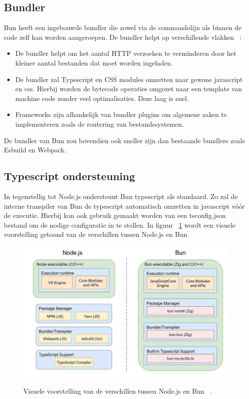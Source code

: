 \subsection{Bundler}
Bun heeft een ingebouwde bundler die zowel via de commandolijn als binnen de code zelf kan worden aangeroepen. 
De bundler helpt op verschillende vlakken ~\autocite{McDonnel2023}:
\begin{itemize}
    \item De bundler helpt om het aantal HTTP verzoeken te verminderen door het kleiner aantal bestanden dat moet worden ingeladen.
    \item De bundler zal Typescript en CSS modules omzetten naar gewone javascript en css. 
    Hierbij worden de bytecode operaties omgezet naar een template van machine code zonder veel optimalisaties. Deze laag is snel.
    \item Frameworks zijn afhankelijk van bundler plugins om algemene zaken te implementeren zoals de routering van bestandssystemen.
\end{itemize}
De bundler van Bun zou bovendien ook sneller zijn dan bestaande bundlers zoals Esbuild en Webpack.

\subsection{Typescript ondersteuning}
In tegenstellig tot Node.js ondersteunt Bun typescript als standaard. 
Zo zal de interne transpiler van Bun de typescript automatisch omzetten in javascript vóór de executie.
Hierbij kan ook gebruik gemaakt worden van een tsconfig.json bestand om de nodige configuratie in te stellen.
In figuur ~\ref{fig:nodevbun} wordt een visuele voorstelling getoond van de verschillen tussen Node.js en Bun

\begin{figure}[H]
    \centering
    \includegraphics[width=.9\textwidth]{graphics/nodevbun.png}
    \caption{\label{fig:nodevbun}}Visuele voorstelling van de verschillen tussen Node.js en Bun ~\autocite{Aghdasi2023}.
\end{figure}

